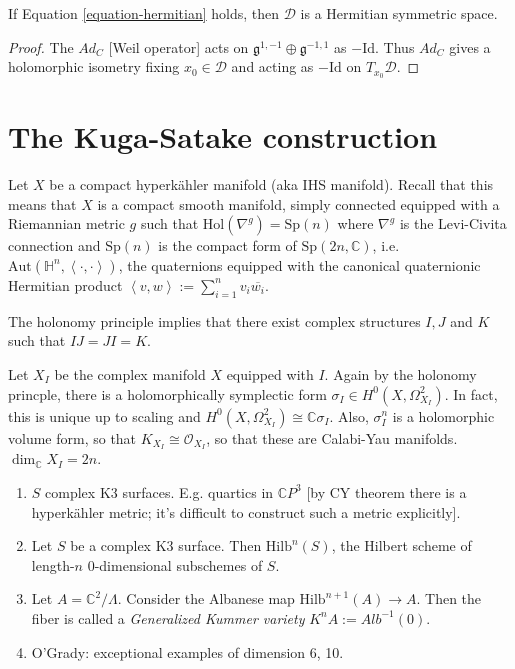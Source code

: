 \begin{proposition}
\label{proposition-hermitian}
If Equation \ref{equation-hermitian} holds,
then $\mathcal{D}$ is a Hermitian symmetric
space.
\end{proposition}

\begin{proof}
The $Ad_C$ [Weil operator] acts on
$\mathfrak{g}^{1,-1}\oplus
\mathfrak{g}^{-1,1}$ as $-\text{Id}$.
Thus $Ad_C$ gives a holomorphic isometry
fixing $x_0\in \mathcal{D}$
and acting as $-\text{Id}$ on
$T_{x_0}\mathcal{D}$.
\end{proof}


\section{The Kuga-Satake construction}
\label{section-kuga-satake}

\noindent
Let $X$ be a compact hyperkähler manifold
(aka IHS manifold).
Recall that this means that $X$ is a
compact smooth manifold, simply connected
equipped with a Riemannian metric $g$ such
that
$\text{Hol}(\nabla^g)=\text{Sp}(n)$
where $\nabla^g$ is the Levi-Civita
connection
and $\text{Sp}(n)$ is the compact form of
$\text{Sp}(2n,\mathbb{C})$,
i.e.
$\text{Aut}(\mathbb{H}^n,\left\langle{}\cdot,
\cdot\right\rangle{})$,
the quaternions equipped with the canonical
quaternionic Hermitian product
$\left\langle{}v,w\right\rangle{}:=\sum_{i=1}
^nv_i\overline{w_i}$.

The holonomy principle implies
that there exist complex structures $I,J$ and
$K$
such that $I J=J I=K$.

Let $X_I$ be the complex manifold $X$
equipped with $I$.
Again by the holonomy princple, there is a
holomorphically symplectic form
$\sigma_I \in H^0(X,\Omega_{X_I}^2)$.
In fact, this is unique up to scaling and
$H^0(X,\Omega_{X_I}^2)\cong
\mathbb{C}\sigma_I$.
Also, $\sigma_I^n$ is a holomorphic volume
form,
so that $K_{X_I}\cong\mathcal{O}_{X_I}$,
so that these are Calabi-Yau manifolds.
$\dim_{\mathbb{C}}X_I=2n$.

\begin{example}
\label{example-hk}
\begin{enumerate}
\item $S$ complex K3 surfaces. E.g. quartics
in $\mathbb{C}P^3$
[by CY theorem there is a hyperkähler metric;
it's difficult to construct such a metric
explicitly].

\item Let $S$ be a complex K3 surface.
Then $\text{Hilb}^n(S)$, the Hilbert scheme
of length-$n$ 0-dimensional subschemes of
$S$.

\item Let $A =\mathbb{C}^2/\Lambda$.
Consider the Albanese map
$\text{Hilb}^{n+1}(A)\to A$.
Then the fiber is called a {\it Generalized
Kummer variety}
$K^nA:=Alb^{-1}(0)$.

\item O'Grady: exceptional examples of
dimension 6, 10.
\end{enumerate}
\end{example}

